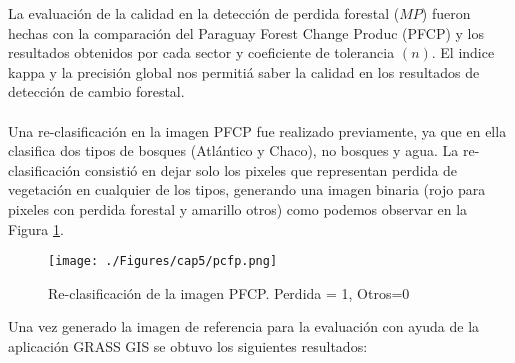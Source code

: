 La evaluaci\'on de la calidad en la detecci\'on de perdida forestal ($ MP $) fueron hechas con la comparaci\'on del Paraguay Forest Change Produc (PFCP) y los resultados obtenidos por cada sector y coeficiente de tolerancia $ (n) $. El indice kappa y la precisi\'on global nos permiti\'a saber la calidad en los resultados de detecci\'on de cambio forestal.\\~\\
Una re-clasificaci\'on en la imagen PFCP fue realizado previamente, ya que en ella clasifica dos tipos de bosques (Atl\'antico y Chaco), no bosques y agua. La re-clasificaci\'on consisti\'o en dejar solo los pixeles que representan perdida de vegetaci\'on en cualquier de los tipos, generando una imagen binaria (rojo para pixeles con perdida forestal y amarillo otros) como podemos observar en la Figura \ref{fig:pfcp}.
\begin{figure}[H]
	\centering
	\texttt{[image: ./Figures/cap5/pcfp.png]}
	\caption{Re-clasificaci\'on de la imagen PFCP. Perdida = 1, Otros=0}
	\label{fig:pfcp}
\end{figure}
Una vez generado la imagen de referencia para la evaluaci\'on con ayuda de la aplicaci\'on GRASS GIS se obtuvo los siguientes resultados:
